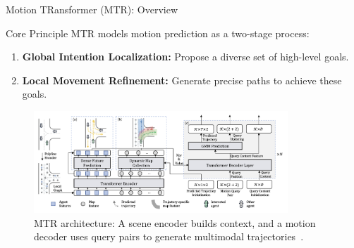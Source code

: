 \documentclass[10pt,aspectratio=169]{beamer}
\begin{document}
\begin{frame}{Motion TRansformer (MTR): Overview}
    \begin{block}{Core Principle}
        MTR models motion prediction as a two-stage process:
        \begin{enumerate}
            \item \textbf{Global Intention Localization:} Propose a diverse set of high-level goals.
            \item \textbf{Local Movement Refinement:} Generate precise paths to achieve these goals.
        \end{enumerate}
    \end{block}
    \begin{figure}
        \centering
        \includegraphics[width=0.85\textwidth]{docs/latex/figures/mtr_overall_architecture_detail.png}
        \caption{MTR architecture: A scene encoder builds context, and a motion decoder uses query pairs to generate multimodal trajectories~\cite{Shi2022MTR}.}
        \label{fig:mtr_architecture_pres}
    \end{figure}
\end{frame}
\end{document}
